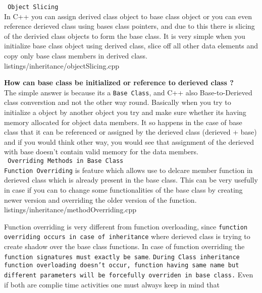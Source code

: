 \documentclass[oops.tex]{subfiles}
\begin{document}
\texttt{ Object Slicing }\\

In C++ you can assign derived class object to base class object or you can even
reference derieved class using bases class pointers, and due to this there is 
slicing of the derivied class objects to form the base class. It is very simple
when you initialize base class object using derived class, slice off all
other data elements and copy only base class members in derived class.\\


{listings/inheritance/objectSlicing.cpp}

{\bf How can base class be initialized or reference to derieved class ?}\\ 
The simple answer is because its a \texttt{Base Class}, and C++ also
Base-to-Derieved class converstion and not the other way round. Basically when
you try to initialize a object by another object you try and make sure
whether its having memory allocated for object data members. It so happens
in the case of base class that it can be referenced or assigned by the derieved
class (derieved + base) and if you would think other way, you would see that
assignment of the derieved with base doesn't contain valid memory for the data
members.\\

\texttt{ Overriding Methods in Base Class }\\

\texttt{Function Overriding} is feature which allows use to delcare member
function in derieved class which is already present in the base class. This can
be very usefully in case if you can to change some functionalities of the base
class by creating newer version and overriding the older version of the
function.\\


{listings/inheritance/methodOverriding.cpp}

Function overriding is very different from function overloading,
since \texttt{function overriding occurs in case of inheritance} where derieved class 
is trying to create shadow over the base class functions. In case of function
overriding the \texttt{function signatures must exactly be same}. \texttt{During 
Class inheritance function overloading doesn't occur, function having same
name but different parameters will be forcefully overriden in base class.}
Even if both are complie time activities one must always keep in mind that
\end{document}
